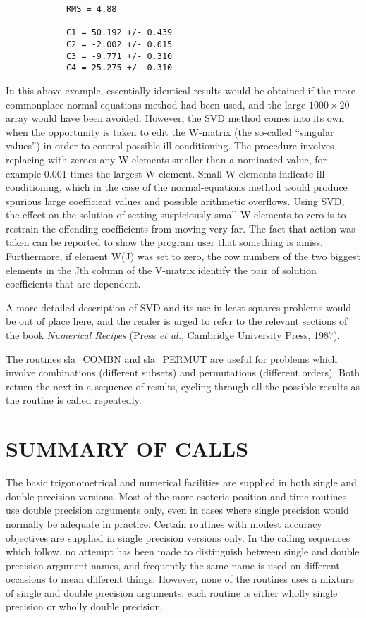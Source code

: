 \documentclass[11pt,twoside]{article}
\begin{document}
\goodbreak
\begin{verbatim}
            RMS = 4.88

            C1 = 50.192 +/- 0.439
            C2 = -2.002 +/- 0.015
            C3 = -9.771 +/- 0.310
            C4 = 25.275 +/- 0.310
\end{verbatim}
\goodbreak
In this above example, essentially
identical results would be obtained if the more
commonplace normal-equations method had been used, and the large
$1000\times20$ array would have been avoided.  However, the SVD method
comes into its own when the opportunity is taken to edit the W-matrix
(the so-called ``singular values'') in order to control
possible ill-conditioning.  The procedure involves replacing with
zeroes any W-elements smaller than a nominated value, for example
0.001 times the largest W-element.  Small W-elements indicate
ill-conditioning, which in the case of the normal-equations
method would produce spurious large coefficient values and
possible arithmetic overflows.  Using SVD, the effect on the solution
of setting suspiciously small W-elements to zero is to restrain
the offending coefficients from moving very far.  The
fact that action was taken can be reported to show the program user that
something is amiss.  Furthermore, if element W(J) was set to zero,
the row numbers of the two biggest elements in the Jth column of the
V-matrix identify the pair of solution coefficients that are
dependent.

A more detailed description of SVD and its use in least-squares
problems would be out of place here, and the reader is urged
to refer to the relevant sections of the book {\it Numerical Recipes}
(Press {\it et al.}, Cambridge University Press, 1987).

The routines
sla\_COMBN
and
sla\_PERMUT
are useful for problems which involve combinations (different subsets)
and permutations (different orders).
Both return the next in a sequence of results, cycling through all the
possible results as the routine is called repeatedly.

\pagebreak

\section{SUMMARY OF CALLS}
The basic trigonometrical and numerical facilities are supplied in both single
and double precision versions.
Most of the more esoteric position and time routines use double precision
arguments only, even in cases where single precision would normally be adequate
in practice.
Certain routines with modest accuracy objectives are supplied in
single precision versions only.
In the calling sequences which follow, no attempt has been made
to distinguish between single and double precision argument names,
and frequently the same name is used on different occasions to
mean different things.
However, none of the routines uses a mixture of single and
double precision arguments;  each routine is either wholly
single precision or wholly double precision.
\end{document}
